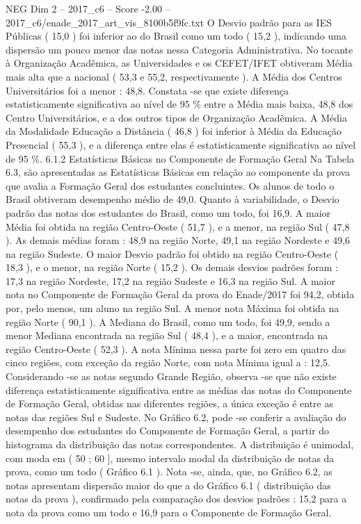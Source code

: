 \begin{textsample}{NEG Dim 2 – 2017\_c6 – Score -2.00 – 2017\_c6/enade\_2017\_art\_vis\_8100b5f9fc.txt}
O Desvio padrão para as IES Públicas ( 15,0 ) foi inferior ao do Brasil como um todo ( 15,2 ), indicando uma dispersão um pouco menor das notas nessa Categoria Administrativa.
No tocante à Organização Acadêmica, as Universidades e os CEFET/IFET obtiveram Média mais alta que a nacional ( 53,3 e 55,2, respectivamente ).
A Média dos Centros Universitários foi a menor : 48,8.
Constata -se que existe diferença estatisticamente significativa ao nível de 95 \% entre a Média mais baixa, 48,8 dos Centro Universitários, e a dos outros tipos de Organização Acadêmica.
A Média da Modalidade Educação a Distância ( 46,8 ) foi inferior à Média da Educação Presencial ( 55,3 ), e a diferença entre elas é estatisticamente significativa ao nível de 95 \%. 6.1.2 Estatísticas Básicas no Componente de Formação Geral Na Tabela 6.3, são apresentadas as Estatísticas Básicas em relação ao componente da prova que avalia a Formação Geral dos estudantes concluintes.
Os alunos de todo o Brasil obtiveram desempenho médio de 49,0.
Quanto à variabilidade, o Desvio padrão das notas dos estudantes do Brasil, como um todo, foi 16,9.
A maior Média foi obtida na região Centro-Oeste ( 51,7 ), e a menor, na região Sul ( 47,8 ).
As demais médias foram : 48,9 na região Norte, 49,1 na região Nordeste e 49,6 na região Sudeste.
O maior Desvio padrão foi obtido na região Centro-Oeste ( 18,3 ), e o menor, na região Norte ( 15,2 ).
Os demais desvios padrões foram : 17,3 na região Nordeste, 17,2 na região Sudeste e 16,3 na região Sul.
A maior nota no Componente de Formação Geral da prova do Enade/2017 foi 94,2, obtida por, pelo menos, um aluno na região Sul.
A menor nota Máxima foi obtida na região Norte ( 90,1 ).
A Mediana do Brasil, como um todo, foi 49,9, sendo a menor Mediana encontrada na região Sul ( 48,4 ), e a maior, encontrada na região Centro-Oeste ( 52,3 ).
A nota Mínima nessa parte foi zero em quatro das cinco regiões, com exceção da região Norte, com nota Mínima igual a : 12,5.
Considerando -se as notas segundo Grande Região, observa -se que não existe diferença estatisticamente significativa entre as médias das notas do Componente de Formação Geral, obtidas nas diferentes regiões, a única exceção é entre as notas das regiões Sul e Sudeste.
No Gráfico 6.2, pode -se conferir a avaliação do desempenho dos estudantes do Componente de Formação Geral, a partir do histograma da distribuição das notas correspondentes.
A distribuição é unimodal, com moda em ( 50 ; 60 ], mesmo intervalo modal da distribuição de notas da prova, como um todo ( Gráfico 6.1 ).
Nota -se, ainda, que, no Gráfico 6.2, as notas apresentam dispersão maior do que a do Gráfico 6.1 ( distribuição das notas da prova ), confirmado pela comparação dos desvios padrões : 15,2 para a nota da prova como um todo e 16,9 para o Componente de Formação Geral.

\end{textsample}
